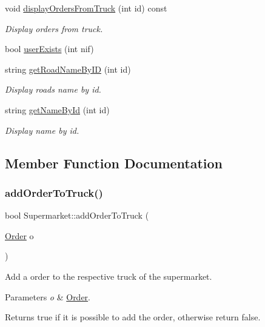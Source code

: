 \begin{DoxyCompactItemize}
void \hyperlink{class_supermarket_a181298e23d410a1db1b257780044bdd7}{display\+Orders\+From\+Truck} (int id) const
\begin{DoxyCompactList}\small\item\em Display orders from truck. \end{DoxyCompactList}\item 
bool \hyperlink{class_supermarket_a12f1deca7800f765ace1f4b8f6b13e3f}{user\+Exists} (int nif)
\item 
string \hyperlink{class_supermarket_a1863ad3453bfecefbd203f2a945a92f6}{get\+Road\+Name\+By\+ID} (int id)
\begin{DoxyCompactList}\small\item\em Display roads name by id. \end{DoxyCompactList}\item 
string \hyperlink{class_supermarket_a427143f25488b61db997b693fb9fed4b}{get\+Name\+By\+Id} (int id)
\begin{DoxyCompactList}\small\item\em Display name by id. \end{DoxyCompactList}\end{DoxyCompactItemize}


\subsection{Member Function Documentation}
\mbox{\label{class_supermarket_a47b8391aece9861f2c59c0ada7c1ca13}} 
\subsubsection{\texorpdfstring{add\+Order\+To\+Truck()}{addOrderToTruck()}}
{\footnotesize\ttfamily bool Supermarket\+::add\+Order\+To\+Truck (\begin{DoxyParamCaption}\item[{\hyperlink{class_order}{Order}}]{o }\end{DoxyParamCaption})}



Add a order to the respective truck of the supermarket. 


\begin{DoxyParams}{Parameters}
{\em o} & \hyperlink{class_order}{Order}.\\
\hline
\end{DoxyParams}
\begin{DoxyReturn}{Returns}
true if it is possible to add the order, otherwise return false. 
\end{DoxyReturn}
\mbox{\label{class_supermarket_ae26172ed726f1c54cfdbf425552647b1}} 
